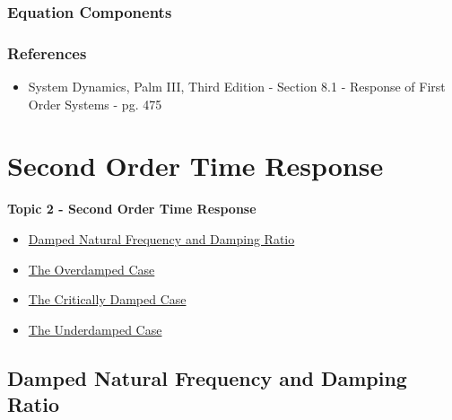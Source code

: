 \documentclass[fleqn]{beamer} %
\newcommand{\sectionIItitle}{Second Order Time Response}
\newcommand{\sectionIsubsectionIVtitle}{Equation Components}
\newcommand{\sectionIIsubsectionItitle}{Damped Natural Frequency and Damping Ratio}
\newcommand{\sectionIIsubsectionIItitle}{The Overdamped Case}
\newcommand{\sectionIIsubsectionIIItitle}{The Critically Damped Case}
\newcommand{\sectionIIsubsectionIVtitle}{The Underdamped Case}
\begin{document}
			\begin{frame}
				\frametitle{\sectionIsubsectionIVtitle}
				\bigskip
				\frametitle{References}

				\begin{itemize}
					\item System Dynamics, Palm III, Third Edition - Section 8.1 - Response of First Order Systems - pg. 475
				\end{itemize}

			

				\btVFill
			\end{frame}

	
	\section{\sectionIItitle}\label{sectionII}

		\begin{frame}
			\large \textbf{Topic 2 - \sectionIItitle} \vspace{3mm}\\

			\begin{itemize}
				\item \hyperlink{sectionIIsubsectionI}{\sectionIIsubsectionItitle} \vspc %
				\item \hyperlink{sectionIIsubsectionII}{\sectionIIsubsectionIItitle} \vspc %
				\item \hyperlink{sectionIIsubsectionIII}{\sectionIIsubsectionIIItitle} \vspc %
				\item \hyperlink{sectionIIsubsectionIV}{\sectionIIsubsectionIVtitle} \vspc %
			\end{itemize}

		\end{frame}

		\subsection{\sectionIIsubsectionItitle}\label{sectionIIsubsectionI}
\end{document}

